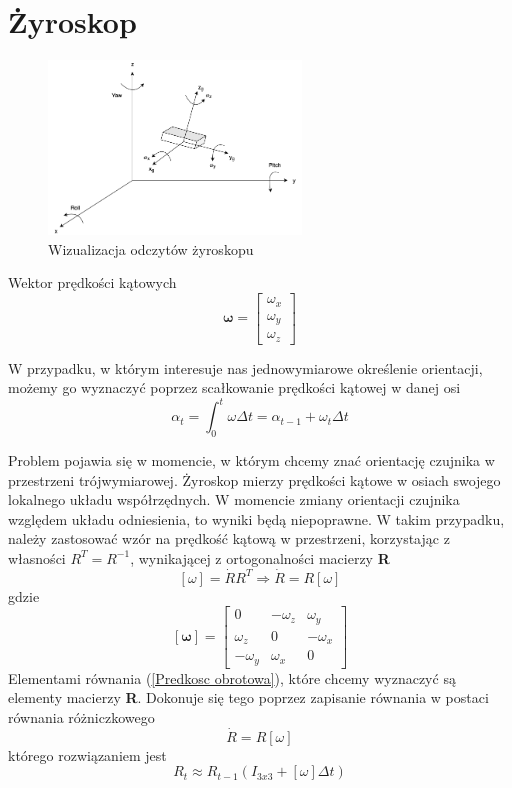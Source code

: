 \section{Żyroskop}

\begin{figure}[!htb]
    \centering
    \includegraphics[width=0.6\textwidth]{Rysunki/Rozdzial03/Zyroskop.png}
    \caption{Wizualizacja odczytów żyroskopu}
\end{figure}

Wektor prędkości kątowych
$$
    \mathbf{\omega} = 
    \left[
    \begin{array}{c}
        \omega_x \\
        \omega_y \\
        \omega_z
    \end{array}
    \right]
$$

W przypadku, w którym interesuje nas jednowymiarowe określenie orientacji, możemy go wyznaczyć poprzez scałkowanie prędkości kątowej w danej osi \cite{Akwizycja}
$$
    \alpha_t = \int_{0}^{t} \omega \Delta t = \alpha_{t-1} + \omega_t \Delta t
$$

Problem pojawia się w momencie, w którym chcemy znać orientację czujnika w przestrzeni trójwymiarowej. Żyroskop mierzy prędkości kątowe w osiach swojego lokalnego układu współrzędnych. W momencie zmiany orientacji czujnika względem układu odniesienia, to wyniki będą niepoprawne. W takim przypadku, należy zastosować wzór na prędkość kątową w przestrzeni, korzystając z własności $R^T=R^{-1}$, wynikającej z ortogonalności macierzy \textbf{R} 
\begin{equation}
    \left[\omega\right] = \dot{R}R^T \Rightarrow \dot{R} = R \left[\omega\right]
    \label{Predkosc obrotowa}
\end{equation}
gdzie
$$
    \mathbf{\left[\omega\right]} = 
    \left[
    \begin{array}{ccc}
        0 & -\omega_z & \omega_y \\
        \omega_z & 0 & -\omega_x \\
        -\omega_y & \omega_x & 0
    \end{array}
    \right]
$$
Elementami równania (\ref{Predkosc obrotowa}), które chcemy wyznaczyć są elementy macierzy \textbf{R}. Dokonuje się tego poprzez zapisanie równania w postaci równania różniczkowego
$$
\dot{R} = R\left[\omega\right]
$$
którego rozwiązaniem jest
$$
    R_t \approx R_{t-1}(I_{3x3}+\left[\omega\right] \Delta t)
$$

